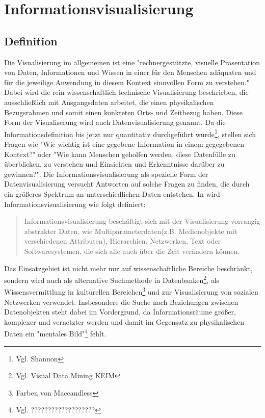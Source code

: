 \documentclass[a4paper, 12pt, DIVcalc, onepage, pdftex, headsepline, footsepline]{scrreprt}
\begin{document}
\chapter{Informationsvisualisierung}
\label{cha:Informationsvisualisierung}
\section{Definition}
\label{sec:Definition}
Die Visualisierung im allgemeinen ist eine "rechnergestützte, visuelle Präsentation von Daten, Informationen und Wissen
in einer für den Menschen adäquaten und für die jeweilige Anwendung in diesem Kontext sinnvollen Form
zu verstehen."\citep[S.\,3]{Schumann}
Dabei wird die rein wissenschaftlich-technische Visualisierung beschrieben, die ausschließlich mit Ausgangsdaten arbeitet,
die einen physikalischen Bezugsrahmen und somit einen konkreten Orts- und Zeitbezug haben. Diese Form der
Visualiserung wird auch Datenvisualisierung genannt.
Da die Informationsdefinition bis jetzt nur quantitativ durchgeführt wurde\footnote{Vgl. Shannon}, stellen sich 
Fragen wie "Wie wichtig ist eine gegebene Information in einem gegegebenen Kontext?"\citep[S.\,341]{Schumann}
oder "Wie kann Menschen geholfen werden, diese Datenfülle zu überblicken, zu verstehen und Einsichten und Erkenntnisse
darüber zu gewinnen?"\citep[S.\,435]{Preim}.
Die Informationsvisualisierung als spezielle Form der Datenvisualisierung versucht Antworten auf solche
Fragen zu finden, die durch ein größeres Spektrum an unterschiedlichen Daten entstehen.
In \citep[S.\,434]{Preim} wird Informationsvisualisierung wie folgt definiert:
\begin{quote}
Informationsvisualisierung beschäftigt sich mit der Visualisierung vorrangig abstrakter Daten, wie
Multiparameterdaten(z.B. Medienobjekte mit verschiedenen Attributen), Hierarchien, Netzwerken, Text
oder Softwaresystemen, die sich alle auch über die Zeit verändern können.
\end{quote}
Das Einsatzgebiet ist nicht mehr nur auf wissenschaftliche Bereiche beschränkt,
sondern wird auch als alternative Suchmethode in Datenbanken\footnote{Vgl. Visual Data Mining KEIM},
als Wissensvermittlung in kulturellen Bereichen\footnote{Farben von Maccandless} und zur Visualisierung von
sozialen Netzwerken verwendet.
Insbesondere die Suche nach Beziehungen zwischen Datenobjekten steht dabei im Vordergrund,
da Informationsräume größer, komplexer und vernetzter werden und damit im Gegensatz
zu physikalischen Daten ein "mentales Bild"\footnote{Vgl. ???????????????????} fehlt.
\end{document}
